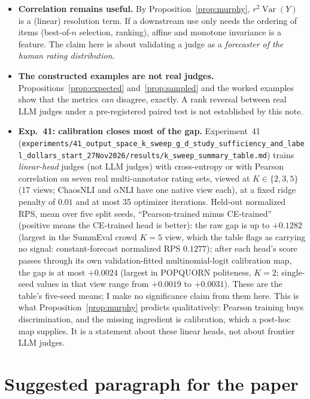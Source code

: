 \documentclass[11pt]{article}
\theoremstyle{remark}
\theoremstyle{definition}
\newcommand{\Var}{\operatorname{Var}}
\newcommand{\1}{\mathbf{1}}
\newcommand{\file}[1]{\nolinkurl{#1}}
\begin{document}
\begin{itemize}
\item \textbf{Correlation remains useful.} By Proposition~\ref{prop:murphy}, $r^{2}\Var(Y)$ is a (linear) resolution term. If a downstream use only needs the ordering of items (best-of-$n$ selection, ranking), affine and monotone invariance is a feature. The claim here is about validating a judge as a \emph{forecaster of the human rating distribution}.
\item \textbf{The constructed examples are not real judges.} Propositions~\ref{prop:expected} and~\ref{prop:sampled} and the worked examples show that the metrics \emph{can} disagree, exactly. A rank reversal between real LLM judges under a pre-registered paired test is not established by this note.
\item \textbf{Exp.~41: calibration closes most of the gap.} Experiment~41 (\file{experiments/41\_output\_space\_k\_sweep\_g\_d\_study\_sufficiency\_and\_label\_dollars\_start\_27Nov2026/results/k\_sweep\_summary\_table.md}) trains \emph{linear-head} judges (not LLM judges) with cross-entropy or with Pearson correlation on seven real multi-annotator rating sets, viewed at $K\in\{2,3,5\}$ (17 views; ChaosNLI and $\alpha$NLI have one native view each), at a fixed ridge penalty of $0.01$ and at most 35 optimizer iterations. Held-out normalized RPS, mean over five split seeds, ``Pearson-trained minus CE-trained'' (positive means the CE-trained head is better): the raw gap is up to $+0.1282$ (largest in the SummEval crowd $K=5$ view, which the table flags as carrying no signal: constant-forecast normalized RPS $0.1277$); after each head's score passes through its own validation-fitted multinomial-logit calibration map, the gap is at most $+0.0024$ (largest in POPQUORN politeness, $K=2$; single-seed values in that view range from $+0.0019$ to $+0.0031$). These are the table's five-seed means; I make no significance claim from them here. This is what Proposition~\ref{prop:murphy} predicts qualitatively: Pearson training buys discrimination, and the missing ingredient is calibration, which a post-hoc map supplies. It is a statement about these linear heads, not about frontier LLM judges.
\end{itemize}

\section{Suggested paragraph for the paper}
\label{sec:paragraph}
\end{document}
